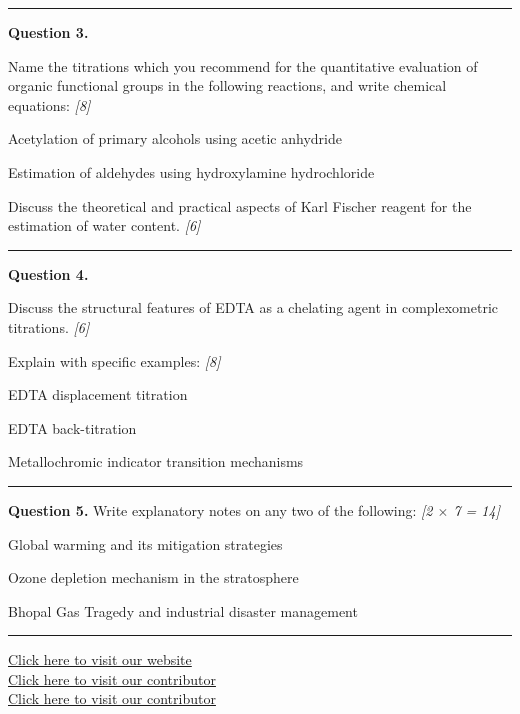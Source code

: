\documentclass[11pt,a4paper]{article}
\newcommand{\pts}[1]{\hfill   \textit{[#1]}}
\begin{document}
\medskip\rule{\linewidth}{0.2pt}




\noindent   \textbf{Question 3.}

\begin{parts}
  \item Name the titrations which you recommend for the quantitative evaluation of organic functional groups in the following reactions, and write chemical equations: \pts{8}
  
\begin{parts}
    \item Acetylation of primary alcohols using acetic anhydride
    \item Estimation of aldehydes using hydroxylamine hydrochloride
  \end{parts}
  \item Discuss the theoretical and practical aspects of Karl Fischer reagent for the estimation of water content. \pts{6}
\end{parts}

\medskip\rule{\linewidth}{0.2pt}




\noindent   \textbf{Question 4.}

\begin{parts}
  \item Discuss the structural features of EDTA as a chelating agent in complexometric titrations. \pts{6}
  \item Explain with specific examples: \pts{8}
  
\begin{parts}
    \item EDTA displacement titration
    \item EDTA back-titration
    \item Metallochromic indicator transition mechanisms
  \end{parts}
\end{parts}

\medskip\rule{\linewidth}{0.2pt}




\noindent   \textbf{Question 5.} Write explanatory notes on any two of the following: \pts{2 $ \times$ 7 = 14}

\begin{parts}
  \item Global warming and its mitigation strategies
  \item Ozone depletion mechanism in the stratosphere
  \item Bhopal Gas Tragedy and industrial disaster management
\end{parts}

\vfill
\rule{\linewidth}{0.4pt}

\begin{center}\small
  \href{https://bhu-exam.vercel.app/}{Click here to visit our website}\\[4pt]
  \href{https://me-aryan.vercel.app/}{Click here to visit our contributor}\\[4pt]
  \href{https://quashan-me.vercel.app/}{Click here to visit our contributor}
\end{center}
\end{document}
